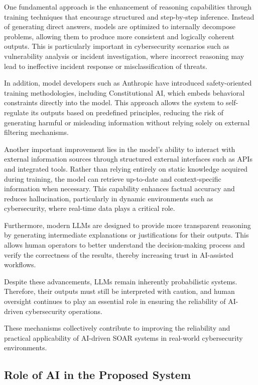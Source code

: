 \documentclass[12pt]{report}
\begin{document}
One fundamental approach is the enhancement of reasoning capabilities through training techniques that encourage structured and step-by-step inference. Instead of generating direct answers, models are optimized to internally decompose problems, allowing them to produce more consistent and logically coherent outputs. This is particularly important in cybersecurity scenarios such as vulnerability analysis or incident investigation, where incorrect reasoning may lead to ineffective incident response or misclassification of threats.

In addition, model developers such as Anthropic have introduced safety-oriented training methodologies, including Constitutional AI, which embeds behavioral constraints directly into the model. This approach allows the system to self-regulate its outputs based on predefined principles, reducing the risk of generating harmful or misleading information without relying solely on external filtering mechanisms.

Another important improvement lies in the model's ability to interact with external information sources through structured external interfaces such as APIs and integrated tools. Rather than relying entirely on static knowledge acquired during training, the model can retrieve up-to-date and context-specific information when necessary. This capability enhances factual accuracy and reduces hallucination, particularly in dynamic environments such as cybersecurity, where real-time data plays a critical role.

Furthermore, modern LLMs are designed to provide more transparent reasoning by generating intermediate explanations or justifications for their outputs. This allows human operators to better understand the decision-making process and verify the correctness of the results, thereby increasing trust in AI-assisted workflows.

Despite these advancements, LLMs remain inherently probabilistic systems. Therefore, their outputs must still be interpreted with caution, and human oversight continues to play an essential role in ensuring the reliability of AI-driven cybersecurity operations.

These mechanisms collectively contribute to improving the reliability and practical applicability of AI-driven SOAR systems in real-world cybersecurity environments.

\subsection{Role of AI in the Proposed System}
\end{document}

